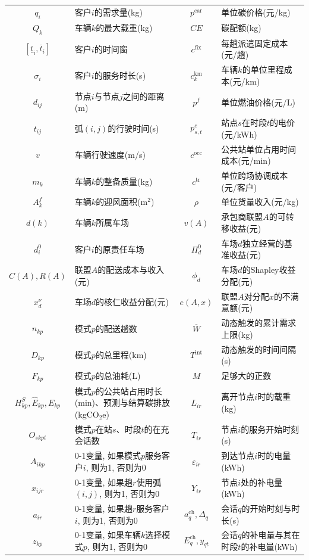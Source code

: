 \documentclass{setp-new}
\begin{document}
\begin{table}[H]
\begin{tabular*}{\linewidth}{@{\extracolsep{\fill}}cJcJ@{}}
$q_i$ & 客户$i$的需求量(kg) & $p^{\mathrm{car}}$ & 单位碳价格(元/kg)\\
$Q_k$ & 车辆$k$的最大载重(kg) & $CE$ & 碳配额(kg)\\
$[\underline t_i,\overline t_i]$ & 客户$i$的时间窗 & $c^{\mathrm{fix}}$ & 每趟派遣固定成本(元/趟)\\
$\sigma_i$ & 客户$i$的服务时长(s) & $c_k^{\mathrm{km}}$ & 车辆$k$的单位里程成本(元/km)\\
$d_{ij}$ & 节点$i$与节点$j$之间的距离(m) & $p^f$ & 单位燃油价格(元/L)\\
$t_{ij}$ & 弧$(i,j)$的行驶时间(s) & $p_{s,t}^{e}$ & 站点$s$在时段$t$的电价(元/kWh)\\
$v$ & 车辆行驶速度(m/s) & $c^{\mathrm{occ}}$ & 公共站单位占用时间成本(元/min)\\
$m_k$ & 车辆$k$的整备质量(kg) & $c^{\mathrm{tr}}$ & 单位跨场协调成本(元/客户)\\
$A_k^f$ & 车辆$k$的迎风面积(m$^2$) & $\rho$ & 单位货量收入(元/kg)\\
$d(k)$ & 车辆$k$所属车场 & $v(A)$ & 承包商联盟$A$的可转移收益(元)\\
$d_i^0$ & 客户$i$的原责任车场 & $\Pi_d^0$ & 车场$d$独立经营的基准收益(元)\\
$C(A),R(A)$ & 联盟$A$的配送成本与收入(元)
& $\phi_d$ & 车场$d$的Shapley收益分配(元)\\
$x_d^{\nu}$ & 车场$d$的核仁收益分配(元)
& $e(A,x)$ & 联盟$A$对分配$x$的不满意额(元)\\
$n_{kp}$ & 模式$p$的配送趟数 & $\overline W$ & 动态触发的累计需求上限(kg)\\
$D_{kp}$ & 模式$p$的总里程(km) & $T^{\mathrm{int}}$ & 动态触发的时间间隔(s)\\
$F_{kp}$ & 模式$p$的总油耗(L) & $M$ & 足够大的正数\\
$H_{kp}^{S},\widehat E_{kp},E_{kp}$ & 模式$p$的公共站占用时长(min)、预测与结算碳排放(kgCO$_2$e) & $L_{ir}$ & 离开节点$i$时的载重(kg)\\
$O_{skpt}$ & 模式$p$在站$s$、时段$t$的在充会话数 & $T_{ir}$ & 节点$i$的服务开始时刻(s)\\
$A_{ikp}$ & 0-1变量, 如果模式$p$服务客户$i$, 则为1, 否则为0 & $\varepsilon_{ir}$ & 到达节点$i$时的电量(kWh)\\
$x_{ijr}$ & 0-1变量, 如果趟$r$使用弧$(i,j)$, 则为1, 否则为0 & $Y_{ir}$ & 节点$i$处的补电量(kWh)\\
$a_{ir}$ & 0-1变量, 如果趟$r$服务客户$i$, 则为1, 否则为0 & $a_q^{\mathrm{ch}},\Delta_q$ & 会话$q$的开始时刻与时长(s)\\
$z_{kp}$ & 0-1变量, 如果车辆$k$选择模式$p$, 则为1, 否则为0 & $E_q^{\mathrm{ch}},y_{qt}$ & 会话$q$的补电量与其在时段$t$的补电量(kWh)\\
\bottomrule
\end{tabular*}
\end{table}
\end{document}
